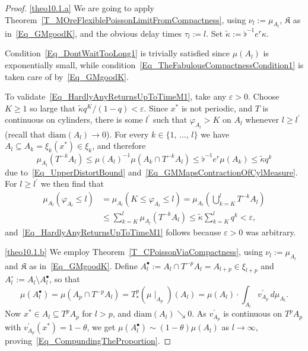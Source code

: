 \documentclass[10pt]{amsart}
\theoremstyle{definition}\newtheorem{defi}[theo]{Definition}\newtheorem{rema}[theo]{Remark}\newtheorem{exam}[theo]{Example}\newtheorem{exem}[theo]{Example}\newtheorem{nota}[theo]{Notation}
\newcommand{\diam}{\mathrm{diam}}
\newcommand{\frkK}{\mathfrak{K}}
\begin{document}
\begin{proof}\leavevmode

\noindent\eqref{theo10.1.a} We are going to apply Theorem~\ref{T_MOreFlexiblePoissonLimitFromCompactness}, using $\nu_{l}:=\mu_{A_{l}}$, $\frkK$ as in~\eqref{Eq_GMgoodK}, and the obvious delay times $\tau _{l}:=l$. Set $\widetilde{\kappa}:=\flat^{-1}e^{r}\kappa$.

Condition~\eqref{Eq_DontWaitTooLong1} is trivially satisfied since $\mu (A_{l})$ is exponentially small, while condition~\eqref{Eq_TheFabulousCompactnessCondition1} is taken care of by~\eqref{Eq_GMgoodK}.

To validate~\eqref{Eq_HardlyAnyReturnsUpToTimeM1}, take any $\varepsilon>0$. Choose $K\geq1$ so large that $\widetilde{\kappa}q^{K}/(1-q)<\varepsilon$. Since $x^{\ast}$ is not periodic, and $T$ is continuous on cylinders, there is some $l^{\prime}$ such that $\varphi_{A_{l}}>K$ on $A_{l}$ whenever $l\geq l^{\prime}$ (recall that $\diam(A_{l})\rightarrow0$). For every $k\in\{1,\,\ldots,\,l\}$ we have $A_{l}\subseteq A_{k}=\xi_{k}(x^{\ast})\in\xi _{k}$, and therefore
\begin{equation}
\mu_{A_{l}}\left(T^{-k}A_{l}\right)\leq\mu(A_{l})^{-1}\mu\left(A_{k}\cap T^{-k}A_{l}\right)\leq
\flat^{-1}e^{r}\mu(A_{k})\leq\widetilde{\kappa}q^{k}
\end{equation}
due to~\eqref{Eq_UpperDistortBound} and~\eqref{Eq_GMMapsContractionOfCylMeasure}. For $l\geq l^{\prime}$ we then find that
\begin{equation}
\begin{split}
\mu_{A_{l}}\left(\varphi_{A_{l}}\leq l\right) & =\mu_{A_{l}}\left(K\leq\varphi_{A_{l}}\leq l\right) =\mu_{A_{l}}\left(\bigcup\nolimits_{k=K}^{l} T^{-k}A_{l}\right)\\
& \leq \sum\nolimits_{k=K}^{l}
\mu_{A_{l}}\left(T^{-k}A_{l}\right) \leq\widetilde{\kappa} \sum\nolimits_{k=K}^{l} q^{k}<\varepsilon,
\end{split}
\end{equation}
and~\eqref{Eq_HardlyAnyReturnsUpToTimeM1} follows because $\varepsilon>0$ was arbitrary.


\noindent\eqref{theo10.1.b} We employ Theorem~\ref{T_CPoissonViaCompactness}, using $\nu _{l}:=\mu_{A_{l}}$ and $\frkK$ as in~\eqref{Eq_GMgoodK}. Define $A_{l}^{\bullet}:=A_{l}\cap T^{-p}A_{l}=A_{l+p}\in\xi_{l+p}$ and $A_{l} ^{\circ}:=A_{l}\setminus A_{l}^{\bullet}$, so that
\[
\mu\left(A_{l}^{\bullet}\right)=\mu\left(A_{p}\cap T^{-p}A_{l}\right)=T_{\ast}^{p}\left(\mu\mid_{A_{p} }\right)(A_{l})=\mu(A_{l})\cdot {\textstyle\int\nolimits_{A_{l}}} v_{A_{p}}^{\prime}\,d\mu_{A_{l}}.
\]
Now $x^{\ast}\in A_{l}\subseteq T^{p}A_{p}$ for $l>p$, and $\diam (A_{l})\searrow0$. As $v_{A_{p}}^{\prime}$ is continuous on $T^{p}A_{p}$ with $v_{A_{p}}^{\prime}(x^{\ast})=1-\theta$, we get $\mu(A_{l}^{\bullet})\sim(1-\theta)\mu(A_{l})$ as $l\rightarrow\infty$, proving~\eqref{Eq_CompundingTheProportion}.


\end{proof}
\end{document}
